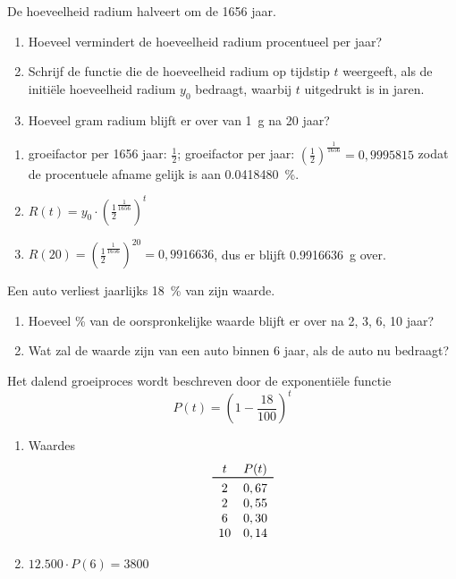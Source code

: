 \begin{oef}
 De hoeveelheid  radium halveert om de  1656 jaar.
    \begin{enumerate}
        \item Hoeveel vermindert de hoeveelheid radium
            procentueel per jaar?
        \item Schrijf de functie  die de hoeveelheid radium op tijdstip
            $t$ weergeeft, als de initi\"ele hoeveelheid radium $y_0$
            bedraagt, waarbij $t$ uitgedrukt is in jaren.
        \item Hoeveel gram radium blijft er over van \SI{1}{\gram} na 20
            jaar?
    \end{enumerate}
\begin{opl}
\begin{enumerate}
\item groeifactor per 1656 jaar: $\frac12$; groeifactor per jaar: $\left(\frac{1}{2}\right)^\frac{1}{1656}=0,9995815$ zodat de procentuele afname gelijk is aan \SI{0,0418480}{\percent}.
\item $R(t)=y_0\cdot \left(\frac{1}{2}^\frac{1}{1656}\right)^t$
\item $R(20)=\left(\frac{1}{2}^\frac{1}{1656}\right)^{20}=0,9916636$, dus er blijft \SI{0.9916636}{\gram} over.
\end{enumerate}
\end{opl}
       \end{oef}


\begin{oef}
Een auto verliest jaarlijks \SI{18}{\percent} van zijn waarde.
\begin{enumerate}
  \item Hoeveel \% van de oorspronkelijke waarde blijft er over na 2, 3, 6, 10 jaar?
  \item Wat zal de waarde zijn van een auto binnen 6 jaar, als de auto nu  bedraagt? 
\end{enumerate}
\begin{opl}
Het dalend groeiproces wordt beschreven door de exponenti\"ele functie
\[
  P(t) = (1 - \frac{18}{100})^t
\]
\begin{enumerate}
  \item Waardes
        \[
          \begin{array}{cc}
            t & P(t) \\
            \toprule
            2 & 0,67 \\
            2 & 0,55 \\
            6 & 0,30 \\
            10 & 0,14 \\
          \end{array}
        \]
  \item $12.500 \cdot P(6) = 3800$
\end{enumerate}
\end{opl}
\end{oef}

